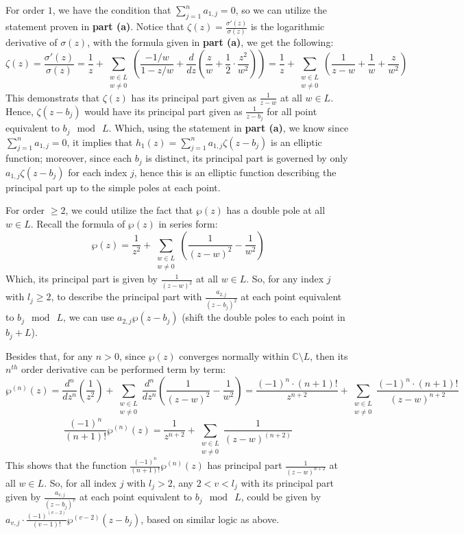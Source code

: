 \documentclass{article}
\begin{document}
\begin{itemize}
    For order $1$, we have the condition that $\sum_{j=1}^{n}a_{1,j}=0$, so we can utilize the statement proven in \textbf{part (a)}. Notice that $\zeta(z)=\frac{\sigma'(z)}{\sigma(z)}$ is the logarithmic derivative of $\sigma(z)$, with the formula given in \textbf{part (a)}, we get the following:
    $$\zeta(z)=\frac{\sigma'(z)}{\sigma(z)}=\frac{1}{z}+\sum_{\substack{w\in L\\w\neq 0}}\left(\frac{-1/w}{1-z/w}+\frac{d}{dz}\left(\frac{z}{w}+\frac{1}{2}\cdot\frac{z^2}{w^2}\right)\right) = \frac{1}{z}+\sum_{\substack{w\in L\\w\neq 0}}\left(\frac{1}{z-w}+\frac{1}{w}+\frac{z}{w^2}\right)$$
    This demonstrats that $\zeta(z)$ has its principal part given as $\frac{1}{z-w}$ at all $w\in L$. Hence, $\zeta(z-b_j)$ would have its principal part given as $\frac{1}{z-b_j}$ for all point equivalent to $b_j\mod\ L$. 
    Which, using the statement in \textbf{part (a)}, we know since $\sum_{j=1}^{n}a_{1,j}=0$, it implies that $h_1(z)=\sum_{j=1}^{n}a_{1,j}\zeta(z-b_j)$ is an elliptic function; moreover, since each $b_j$ is distinct, its principal part is governed by only $a_{1,j}\zeta(z-b_j)$ for each index $j$, hence this is an elliptic function describing the principal part up to the simple poles at each point.

    \hfil

    For order $\geq 2$, we could utilize the fact that $\wp(z)$ has a double pole at all $w\in L$. Recall the formula of $\wp(z)$ in series form:
    $$\wp(z) = \frac{1}{z^2}+\sum_{\substack{w\in L\\w\neq 0}}\left(\frac{1}{(z-w)^2}-\frac{1}{w^2}\right)$$
    Which, its principal part is given by $\frac{1}{(z-w)^2}$ at all $w\in L$. So, for any index $j$ with $l_j\geq 2$, to describe the principal part with $\frac{a_{2,j}}{(z-b_j)^2}$ at each point equivalent to $b_j\mod\ L$, we can use $a_{2,j}\wp(z-b_j)$ (shift the double poles to each point in $b_j+L$).
    
    Besides that, for any $n> 0$, since $\wp(z)$ converges normally within $\mathbb{C}\setminus L$, then its $n^{th}$ order derivative can be performed term by term:
    $$\wp^{(n)}(z)=\frac{d^n}{dz^n}\left(\frac{1}{z^2}\right)+\sum_{\substack{w\in L\\w\neq 0}}\frac{d^n}{dz^n}\left(\frac{1}{(z-w)^2}-\frac{1}{w^2}\right) = \frac{(-1)^n\cdot (n+1)!}{z^{n+2}}+\sum_{\substack{w\in L\\w\neq 0}}\frac{(-1)^n\cdot (n+1)!}{(z-w)^{n+2}}$$
    $$\frac{(-1)^n}{(n+1)!}\wp^{(n)}(z) = \frac{1}{z^{n+2}}+\sum_{\substack{w\in L\\w\neq 0}}\frac{1}{(z-w)^{(n+2)}}$$
    This shows that the function $\frac{(-1)^n}{(n+1)!}\wp^{(n)}(z)$ has principal part $\frac{1}{(z-w)^{n+2}}$ at all $w\in L$. So, for all index $j$ with $l_j >2$, any $2<v<l_j$ with its principal part given by $\frac{a_{v,j}}{(z-b_j)^{v}}$ at each point equivalent to $b_j\mod\ L$, could be given by $a_{v,j}\cdot\frac{(-1)^{(v-2)}}{(v-1)!}\wp^{(v-2)}(z-b_j)$, based on similar logic as above.


\end{itemize}
\end{document}
